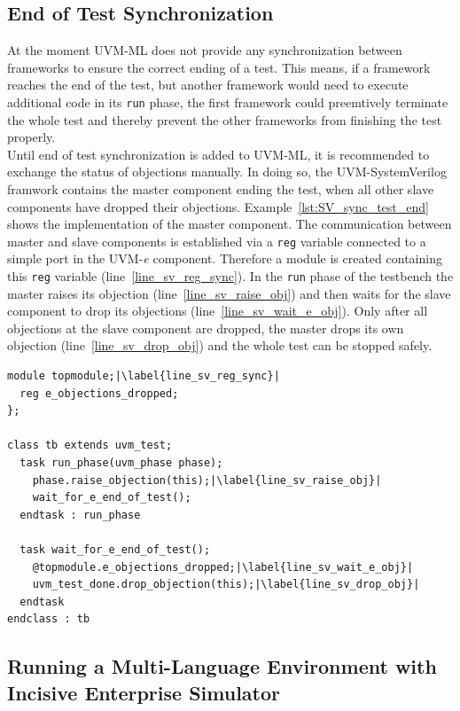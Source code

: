 \subsection{End of Test Synchronization}
At the moment UVM-ML does not provide any synchronization between frameworks to ensure the correct ending of a test. This means, if a framework reaches the end of the test, but another framework would need to execute additional code in its \lstinline$run$ phase, the first framework could preemtively terminate the whole test and thereby prevent the other frameworks from finishing the test properly.\\
Until end of test synchronization is added to UVM-ML, it is recommended to exchange the status of objections manually. In doing so, the UVM-SystemVerilog framwork contains the master component ending the test, when all other slave components have dropped their objections. Example~\ref{lst:SV_sync_test_end} shows the implementation of the master component. The communication between master and slave components is established via a \lstinline$reg$ variable connected to a simple port in the UVM-\textit{e} component. Therefore a module is created containing this \lstinline$reg$ variable (line~\ref{line_sv_reg_sync}). In the \lstinline$run$ phase of the testbench the master raises its objection (line~\ref{line_sv_raise_obj}) and then waits for the slave component to drop its objections (line~\ref{line_sv_wait_e_obj}). Only after all objections at the slave component are dropped, the master drops its own objection (line~\ref{line_sv_drop_obj}) and the whole test can be stopped safely.
\lstset{language=SystemVerilog, numbers = left, escapechar=|, breaklines=true}
\begin{lstlisting}[frame=htrbl, caption={SystemVerilog: ending the test when UVM-\textit{e} components are ready},
label={lst:SV_sync_test_end}]
module topmodule;|\label{line_sv_reg_sync}|
  reg e_objections_dropped;
};

class tb extends uvm_test;
  task run_phase(uvm_phase phase);
    phase.raise_objection(this);|\label{line_sv_raise_obj}|
    wait_for_e_end_of_test();
  endtask : run_phase
  
  task wait_for_e_end_of_test();
    @topmodule.e_objections_dropped;|\label{line_sv_wait_e_obj}|
    uvm_test_done.drop_objection(this);|\label{line_sv_drop_obj}|
  endtask
endclass : tb
\end{lstlisting}
\subsection{Running a Multi-Language Environment with Incisive Enterprise Simulator}

